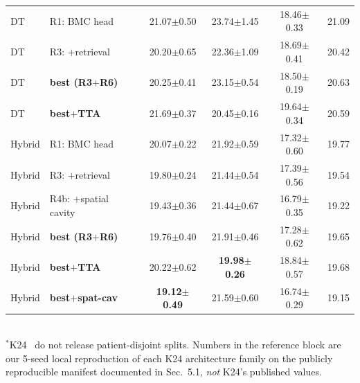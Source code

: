 \begin{table}[t]
{\begin{tabular}{l l c c c c}
\midrule
DT     & R1: BMC head                  & 21.07$\pm$0.50 & 23.74$\pm$1.45 & 18.46$\pm$0.33 & 21.09 \\
DT     & R3: $+$retrieval               & 20.20$\pm$0.65 & 22.36$\pm$1.09 & 18.69$\pm$0.41 & 20.42 \\
DT     & \textbf{best (R3$+$R6)}         & 20.25$\pm$0.41 & 23.15$\pm$0.54 & 18.50$\pm$0.19 & 20.63 \\
DT     & \textbf{best$+$TTA}             & 21.69$\pm$0.37 & 20.45$\pm$0.16 & 19.64$\pm$0.34 & 20.59 \\
\midrule
Hybrid & R1: BMC head                  & 20.07$\pm$0.22 & 21.92$\pm$0.59 & 17.32$\pm$0.60 & 19.77 \\
Hybrid & R3: $+$retrieval               & 19.80$\pm$0.24 & 21.44$\pm$0.54 & 17.39$\pm$0.56 & 19.54 \\
Hybrid & R4b: $+$spatial cavity         & 19.43$\pm$0.36 & 21.44$\pm$0.67 & 16.79$\pm$0.35 & 19.22 \\
Hybrid & \textbf{best (R3$+$R6)}         & 19.76$\pm$0.40 & 21.91$\pm$0.46 & 17.28$\pm$0.62 & 19.65 \\
Hybrid & \textbf{best$+$TTA}             & 20.22$\pm$0.62 & \textbf{19.98$\pm$0.26} & 18.84$\pm$0.57 & 19.68 \\
Hybrid & \textbf{best$+$spat-cav}        & \textbf{19.12$\pm$0.49} & 21.59$\pm$0.60 & 16.74$\pm$0.29 & 19.15 \\
\bottomrule
\end{tabular}%
}
\\[3pt]
{\footnotesize $^\ast$K24~\cite{kantipudi2024} do not release patient-disjoint splits. Numbers in the reference block are our 5-seed local reproduction of each K24 architecture family on the publicly reproducible manifest documented in Sec.~5.1, \emph{not} K24's published values.}
\end{table}
